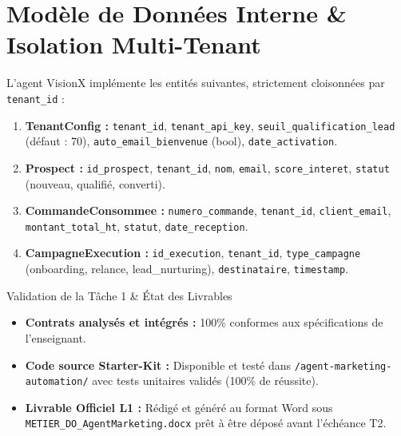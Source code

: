 \documentclass[11pt,a4paper]{article}
\begin{document}
\section{Modèle de Données Interne \& Isolation Multi-Tenant}
L'agent VisionX implémente les entités suivantes, strictement cloisonnées par \texttt{tenant\_id} :
\begin{enumerate}[leftmargin=*, itemsep=1.5pt]
    \item \textbf{TenantConfig :} \texttt{tenant\_id}, \texttt{tenant\_api\_key}, \texttt{seuil\_qualification\_lead} (défaut : 70), \texttt{auto\_email\_bienvenue} (bool), \texttt{date\_activation}.
    \item \textbf{Prospect :} \texttt{id\_prospect}, \texttt{tenant\_id}, \texttt{nom}, \texttt{email}, \texttt{score\_interet}, \texttt{statut} (nouveau, qualifié, converti).
    \item \textbf{CommandeConsommee :} \texttt{numero\_commande}, \texttt{tenant\_id}, \texttt{client\_email}, \texttt{montant\_total\_ht}, \texttt{statut}, \texttt{date\_reception}.
    \item \textbf{CampagneExecution :} \texttt{id\_execution}, \texttt{tenant\_id}, \texttt{type\_campagne} (onboarding, relance, lead\_nurturing), \texttt{destinataire}, \texttt{timestamp}.
\end{enumerate}

\begin{successbox}{Validation de la Tâche 1 \& État des Livrables}
\begin{itemize}[leftmargin=*, itemsep=2pt]
    \item \textbf{Contrats analysés et intégrés :} 100\% conformes aux spécifications de l'enseignant.
    \item \textbf{Code source Starter-Kit :} Disponible et testé dans \texttt{/agent-marketing-automation/} avec tests unitaires validés (100\% de réussite).
    \item \textbf{Livrable Officiel L1 :} Rédigé et généré au format Word sous \texttt{METIER\_DO\_AgentMarketing.docx} prêt à être déposé avant l'échéance T2.
\end{itemize}
\end{successbox}
\end{document}
